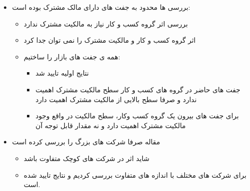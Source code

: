 \documentclass[12pt, a4paper]{article}
\begin{document}
\begin{itemize}
\item
بررسی ها محدود به جفت های دارای مالک مشترک بوده است:
\begin{itemize}
\item
بررسی اثر گروه کسب و کار نیاز به مالکیت مشترک ندارد
\item
اثر گروه کسب و کار و مالکیت مشترک را نمی توان جدا کرد
\item 
همه ی جفت های بازار را ساختیم:
\begin{itemize}
\item
نتایج اولیه تایید شد
\item 
جفت های حاضر در گروه های کسب و کار سطح مالکیت مشترک اهمیت ندارد و صرفا سطح بالایی از مالکیت مشترک اهمیت دارد
\item
برای جفت های بیرون یک گروه کسب وکار، سطح مالکیت در واقع وجود مالکیت مشترک اهمیت دارد و نه مقدار قابل توجه آن
\end{itemize}
\end{itemize}
\end{itemize}

\begin{itemize}
\item
مقاله 
صرفا شرکت های بزرگ را بررسی کرده است
\begin{itemize}
\item 
شاید اثر در شرکت های کوچک متفاوت باشد
\item
برای شرکت های مختلف با اندازه های متفاوت بررسی کردیم و نتایج تایید شده است.
\end{itemize}
\end{itemize}
\end{document}
